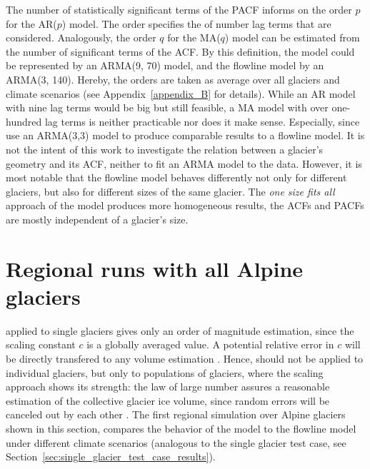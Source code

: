       The number of statistically significant terms of the PACF informs on the order $p$ for the AR($p$) model. The order specifies the of number lag terms that are considered. Analogously, the order $q$ for the MA($q$) model can be estimated from the number of significant terms of the ACF. By this definition, the \vas{} model could be represented by an ARMA(9, 70) model, and the flowline model by an ARMA(3, 140). Hereby, the orders are taken as average over all glaciers and climate scenarios (see Appendix~\ref{appendix_B} for details). While an AR model with nine lag terms would be big but still feasible, a MA model with over one-hundred lag terms is neither practicable nor does it make sense. Especially, since \citet{Roe2014} use an ARMA(3,3) model to produce comparable results to a flowline model. It is not the intent of this work to investigate the relation between a glacier's geometry and its ACF, neither to fit an ARMA model to the data. However, it is most notable that the flowline model behaves differently not only for different glaciers, but also for different sizes of the same glacier. The \textit{one size fits all} approach of the \vas{} model produces more homogeneous results, the ACFs and PACFs are mostly independent of a glacier's size.



  \section{Regional runs with all Alpine glaciers} %
  \label{sec:regional_runs_with_all_alpine_glaciers_results}

    \Vas{} applied to single glaciers gives only an order of magnitude estimation, since the scaling constant $c$ is a globally averaged value. A potential relative error in $c$ will be directly transfered to any volume estimation \citep{Bahr2015}. Hence, \vas{} should not be applied to individual glaciers, but only to populations of glaciers, where the scaling approach shows its strength: the law of large number assures a reasonable estimation of the collective glacier ice volume, since random errors will be canceled out by each other \citep{Bahr2015}.
    The first regional simulation over Alpine glaciers shown in this section, compares the behavior of the \vas{} model to the flowline model under different climate scenarios (analogous to the single glacier test case, see Section~\ref{sec:single_glacier_test_case_results}).


